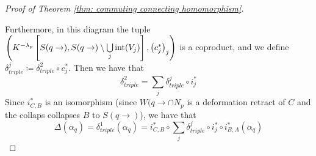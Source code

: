 \begin{proof}[Proof of Theorem \ref{thm: commuting connecting homomorphism}]
\begin{fdiagram}
\begin{tikzcd}
			\end{tikzcd} 
		\end{fdiagram}
		\noindent	Furthermore, in this diagram the tuple $\left(K^{-\lambda_p}\left[ S(q\to),S(q\to)\setminus \bigcup\limits_j \operatorname{\mathrm{int}}(V_j) \right],\left(c_j^*\right)_j\right)$ is a coproduct, and we define  $\delta^j_{triple}\coloneq \delta^2_{triple}\circ c_j^*$. Then we have that 
		\begin{equation*}
			\delta^2_ {triple}=\sum_j\delta^j_{triple}\circ i_j^*
		\end{equation*}
		Since $i_{C,B}^*$ is an isomorphism (since $W(q\to \cap N_p$ is a deformation retract of $C$ and the collaps collapses $B$ to $S(q\to)$), we have that 
		\begin{equation} \label{eq: Delta in terms of delta j}
			\Delta(\alpha_q)=\delta^1_{triple}(\alpha_q)=i^*_{C,B}\circ \sum_j\delta^j_{triple}\circ i_j^* \circ i^*_{B,A}(\alpha_q)
		\end{equation}
		

\end{proof}
